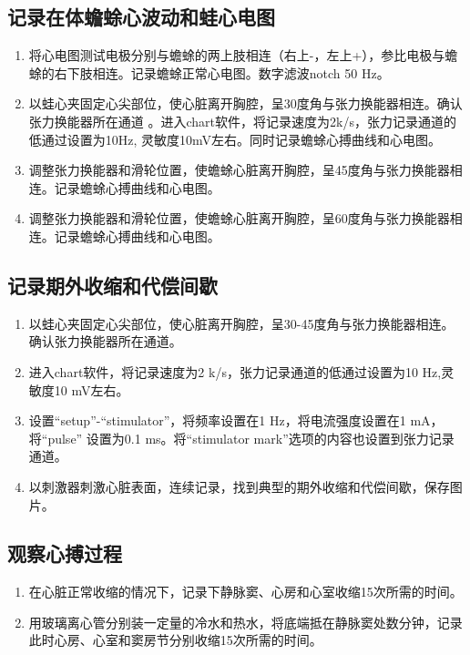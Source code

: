 \documentclass[UTF8]{article}
\begin{document}
    \subsection{记录在体蟾蜍心波动和蛙心电图}
    \begin{enumerate}
      \item 将心电图测试电极分别与蟾蜍的两上肢相连（右上-，左上+），参比电极与蟾蜍的右下肢相连。记录蟾蜍正常心电图。数字滤波notch 50 Hz。
      \item 以蛙心夹固定心尖部位，使心脏离开胸腔，呈30度角与张力换能器相连。确认张力换能器所在通道 。进入chart软件，将记录速度为2k/s，张力记录通道的低通过设置为10Hz, 灵敏度10mV左右。同时记录蟾蜍心搏曲线和心电图。
      \item 调整张力换能器和滑轮位置，使蟾蜍心脏离开胸腔，呈45度角与张力换能器相连。记录蟾蜍心搏曲线和心电图。
      \item 调整张力换能器和滑轮位置，使蟾蜍心脏离开胸腔，呈60度角与张力换能器相连。记录蟾蜍心搏曲线和心电图。
    \end{enumerate}
    \subsection{记录期外收缩和代偿间歇}
    \begin{enumerate}
      \item 以蛙心夹固定心尖部位，使心脏离开胸腔，呈30-45度角与张力换能器相连。确认张力换能器所在通道。
      \item 进入chart软件，将记录速度为2 k/s，张力记录通道的低通过设置为10 Hz,灵敏度10 mV左右。
      \item 设置“setup”-“stimulator”，将频率设置在1 Hz，将电流强度设置在1 mA，将“pulse” 设置为0.1 ms。将“stimulator mark”选项的内容也设置到张力记录通道。
      \item 以刺激器刺激心脏表面，连续记录，找到典型的期外收缩和代偿间歇，保存图片。
    \end{enumerate}
    \subsection{观察心搏过程}
    \begin{enumerate}
      \item 在心脏正常收缩的情况下，记录下静脉窦、心房和心室收缩15次所需的时间。
      \item 用玻璃离心管分别装一定量的冷水和热水，将底端抵在静脉窦处数分钟，记录此时心房、心室和窦房节分别收缩15次所需的时间。
    \end{enumerate}
\end{document}
